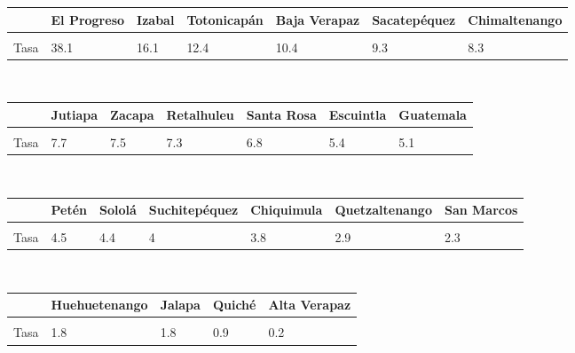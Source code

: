 \begin{tabular}[t]{p{2cm}p{2cm}p{2cm}p{2cm}p{2cm}p{2cm}p{2cm}}
\toprule
\textbf{ } & \textbf{El Progreso} & \textbf{Izabal} & \textbf{Totonicapán} & \textbf{Baja Verapaz} & \textbf{Sacatepéquez} & \textbf{Chimaltenango}\\
\midrule
\cellcolor[HTML]{B6B3FF}{Denuncias} & \cellcolor[HTML]{B6B3FF}{3795.0} & \cellcolor[HTML]{B6B3FF}{3700.0} & \cellcolor[HTML]{B6B3FF}{3279.0} & \cellcolor[HTML]{B6B3FF}{1814.0} & \cellcolor[HTML]{B6B3FF}{1926.0} & \cellcolor[HTML]{B6B3FF}{3182.0}\\
Tasa & 38.1 & 16.1 & 12.4 & 10.4 & 9.3 & 8.3\\
\bottomrule
\end{tabular}
\\[1cm]
\begin{tabular}[t]{p{2cm}p{2cm}p{2cm}p{2cm}p{2cm}p{2cm}p{2cm}}
	\toprule
	\textbf{ } & \textbf{Jutiapa} & \textbf{Zacapa} & \textbf{Retalhuleu} & \textbf{Santa Rosa} & \textbf{Escuintla} & \textbf{Guatemala}\\
	\midrule
	\cellcolor[HTML]{B6B3FF}{Denuncias} & \cellcolor[HTML]{B6B3FF}{2170.0} & \cellcolor[HTML]{B6B3FF}{1060.0} & \cellcolor[HTML]{B6B3FF}{1415.0} & \cellcolor[HTML]{B6B3FF}{1583.0} & \cellcolor[HTML]{B6B3FF}{2169.0} & \cellcolor[HTML]{B6B3FF}{9562.0}\\
	Tasa & 7.7 & 7.5 & 7.3 & 6.8 & 5.4 & 5.1\\
	\bottomrule
\end{tabular}
\\[1cm]
\begin{tabular}[t]{p{2cm}p{2cm}p{2cm}p{2cm}p{2cm}p{2cm}p{2cm}}
	\toprule
	\textbf{ } & \textbf{Petén} & \textbf{Sololá} & \textbf{Suchitepéquez} & \textbf{Chiquimula} & \textbf{Quetzaltenango} & \textbf{San Marcos}\\
	\midrule
	\cellcolor[HTML]{B6B3FF}{Denuncias} & \cellcolor[HTML]{B6B3FF}{1411.0} & \cellcolor[HTML]{B6B3FF}{1095.0} & \cellcolor[HTML]{B6B3FF}{1268} & \cellcolor[HTML]{B6B3FF}{896.0} & \cellcolor[HTML]{B6B3FF}{1434.0} & \cellcolor[HTML]{B6B3FF}{1439.0}\\
	Tasa & 4.5 & 4.4 & 4 & 3.8 & 2.9 & 2.3\\
	\bottomrule
\end{tabular}
\\[1cm]
\begin{tabular}[t]{p{2cm}p{2cm}p{2cm}p{2cm}p{2cm}}
	\toprule
	\textbf{ } & \textbf{Huehuetenango} & \textbf{Jalapa} & \textbf{Quiché} & \textbf{Alta Verapaz}\\
	\midrule
	\cellcolor[HTML]{B6B3FF}{Denuncias} & \cellcolor[HTML]{B6B3FF}{1360.0} & \cellcolor[HTML]{B6B3FF}{378.0} & \cellcolor[HTML]{B6B3FF}{511.0} & \cellcolor[HTML]{B6B3FF}{113.0}\\
	Tasa & 1.8 & 1.8 & 0.9 & 0.2\\
	\bottomrule
\end{tabular}